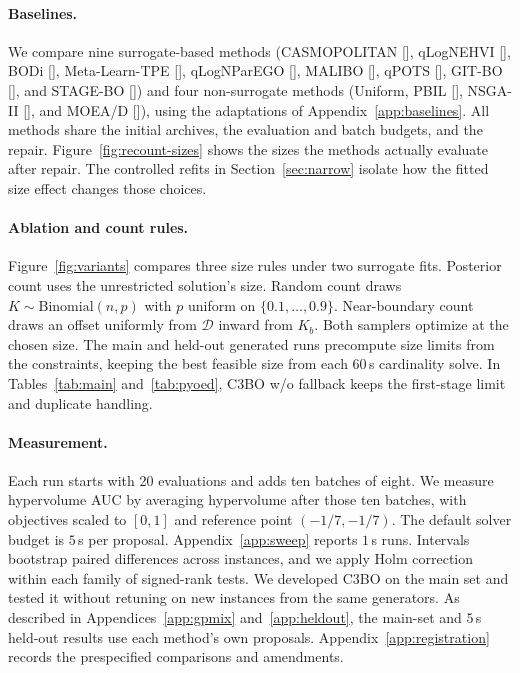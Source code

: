 \documentclass{article}
\newcommand{\revtext}[1]{{\color{blue}#1}}
\theoremstyle{remark}\newtheorem{remark}[proposition]{Remark}
\begin{document}
\paragraph{Baselines.}
\revtext{We compare nine surrogate-based methods (CASMOPOLITAN [\citealp{pmlr-v139-wan21b}], qLogNEHVI [\citealp{daulton2021parallel}], BODi [\citealp{deshwal2023bayesian}], Meta-Learn-TPE [\citealp{watanabe2023metamotpe}], qLogNParEGO [\citealp{ament2023unexpected}], MALIBO [\citealp{pmlr-v235-pan24b}], qPOTS [\citealp{33523504fb214ab4be9971ced3b8e9e0}], GIT-BO [\citealp{yu2026git}], and STAGE-BO [\citealp{yang2026multiobjective}]) and four non-surrogate methods (Uniform, PBIL [\citealp{baluja1994population}], NSGA-II [\citealp{deb2002fast}], and MOEA/D [\citealp{zhang2007moea}]), using the adaptations of Appendix~\ref{app:baselines}.} All methods share the initial archives, the
evaluation and batch budgets, and the repair. \revtext{Figure~\ref{fig:recount-sizes} shows the sizes the methods actually evaluate after repair. The controlled refits in Section~\ref{sec:narrow} isolate how the fitted size effect changes those choices.}

\paragraph{Ablation and count rules.}
\revtext{Figure~\ref{fig:variants} compares three size rules under two surrogate fits. Posterior count uses the unrestricted solution's size. Random count draws $K\sim\mathrm{Binomial}(n,p)$ with $p$ uniform on $\{0.1,\dots,0.9\}$. Near-boundary count draws an offset uniformly from $\mathcal D$ inward from $K_b$. Both samplers optimize at the chosen size. The main and held-out generated runs precompute size limits from the constraints, keeping the best feasible size from each 60\,s cardinality solve. In Tables~\ref{tab:main} and~\ref{tab:pyoed}, C3BO w/o fallback keeps the first-stage limit and duplicate handling.}

\paragraph{Measurement.}
\revtext{Each run starts with 20 evaluations and adds ten batches of eight. We measure hypervolume AUC by averaging hypervolume after those ten batches, with objectives scaled to $[0,1]$ and reference point $(-1/7,-1/7)$. The default solver budget is $5$\,s per proposal. Appendix~\ref{app:sweep} reports $1$\,s runs. Intervals bootstrap paired differences across instances, and we apply Holm correction within each family of signed-rank tests. We developed C3BO on the main set and tested it without retuning on new instances from the same generators. As described in Appendices~\ref{app:gpmix} and~\ref{app:heldout}, the main-set and $5$\,s held-out results use each method's own proposals. Appendix~\ref{app:registration} records the prespecified comparisons and amendments.}
\end{document}

